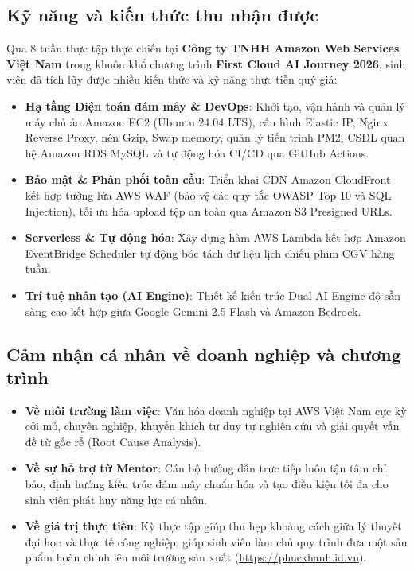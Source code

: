 \documentclass[a4paper]{article}
\theoremstyle{definition}
\begin{document}
\subsection{Kỹ năng và kiến thức thu nhận được}
Qua 8 tuần thực tập thực chiến tại \textbf{Công ty TNHH Amazon Web Services Việt Nam} trong khuôn khổ chương trình \textbf{First Cloud AI Journey 2026}, sinh viên đã tích lũy được nhiều kiến thức và kỹ năng thực tiễn quý giá:
\begin{itemize}
    \item \textbf{Hạ tầng Điện toán đám mây \& DevOps}: Khởi tạo, vận hành và quản lý máy chủ ảo Amazon EC2 (Ubuntu 24.04 LTS), cấu hình Elastic IP, Nginx Reverse Proxy, nén Gzip, Swap memory, quản lý tiến trình PM2, CSDL quan hệ Amazon RDS MySQL và tự động hóa CI/CD qua GitHub Actions.
    \item \textbf{Bảo mật \& Phân phối toàn cầu}: Triển khai CDN Amazon CloudFront kết hợp tường lửa AWS WAF (bảo vệ các quy tắc OWASP Top 10 và SQL Injection), tối ưu hóa upload tệp an toàn qua Amazon S3 Presigned URLs.
    \item \textbf{Serverless \& Tự động hóa}: Xây dựng hàm AWS Lambda kết hợp Amazon EventBridge Scheduler tự động bóc tách dữ liệu lịch chiếu phim CGV hàng tuần.
    \item \textbf{Trí tuệ nhân tạo (AI Engine)}: Thiết kế kiến trúc Dual-AI Engine độ sẵn sàng cao kết hợp giữa Google Gemini 2.5 Flash và Amazon Bedrock.
\end{itemize}

\subsection{Cảm nhận cá nhân về doanh nghiệp và chương trình}
\begin{itemize}
    \item \textbf{Về môi trường làm việc}: Văn hóa doanh nghiệp tại AWS Việt Nam cực kỳ cởi mở, chuyên nghiệp, khuyến khích tư duy tự nghiên cứu và giải quyết vấn đề từ gốc rễ (Root Cause Analysis).
    \item \textbf{Về sự hỗ trợ từ Mentor}: Cán bộ hướng dẫn trực tiếp luôn tận tâm chỉ bảo, định hướng kiến trúc đám mây chuẩn hóa và tạo điều kiện tối đa cho sinh viên phát huy năng lực cá nhân.
    \item \textbf{Về giá trị thực tiễn}: Kỳ thực tập giúp thu hẹp khoảng cách giữa lý thuyết đại học và thực tế công nghiệp, giúp sinh viên làm chủ quy trình đưa một sản phẩm hoàn chỉnh lên môi trường sản xuất (\url{https://phuckhanh.id.vn}).
\end{itemize}
\end{document}
